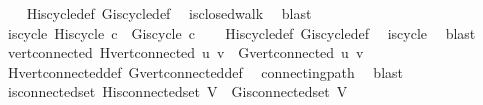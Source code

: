\begin{isabellebody}
%
\isadelimproof
\ \ %
\endisadelimproof
%
\isatagproof
{}\isamarkupfalse%
\ H{\isachardot}{\kern0pt}is{\isacharunderscore}{\kern0pt}cycle{\isacharunderscore}{\kern0pt}def\ G{\isachardot}{\kern0pt}is{\isacharunderscore}{\kern0pt}cycle{\isacharunderscore}{\kern0pt}def\ \isamarkupfalse%
\ is{\isacharunderscore}{\kern0pt}closed{\isacharunderscore}{\kern0pt}walk\ \isamarkupfalse%
\ blast%
\endisatagproof
{\isafoldproof}%
%
\isadelimproof
\isanewline
%
\endisadelimproof
\isanewline
{}\isamarkupfalse%
\ is{\isacharunderscore}{\kern0pt}cycle{}{\isacharcolon}{\kern0pt}\ {\isachardoublequoteopen}H{\isachardot}{\kern0pt}is{\isacharunderscore}{\kern0pt}cycle{}\ c\ {\isasymLongrightarrow}\ G{\isachardot}{\kern0pt}is{\isacharunderscore}{\kern0pt}cycle{}\ c{\isachardoublequoteclose}\isanewline
%
\isadelimproof
\ \ %
\endisadelimproof
%
\isatagproof
{}\isamarkupfalse%
\ H{\isachardot}{\kern0pt}is{\isacharunderscore}{\kern0pt}cycle{}{\isacharunderscore}{\kern0pt}def\ G{\isachardot}{\kern0pt}is{\isacharunderscore}{\kern0pt}cycle{}{\isacharunderscore}{\kern0pt}def\ \isamarkupfalse%
\ is{\isacharunderscore}{\kern0pt}cycle\ \isamarkupfalse%
\ blast%
\endisatagproof
{\isafoldproof}%
%
\isadelimproof
\isanewline
%
\endisadelimproof
\isanewline
{}\isamarkupfalse%
\ vert{\isacharunderscore}{\kern0pt}connected{\isacharcolon}{\kern0pt}\ {\isachardoublequoteopen}H{\isachardot}{\kern0pt}vert{\isacharunderscore}{\kern0pt}connected\ u\ v\ {\isasymLongrightarrow}\ G{\isachardot}{\kern0pt}vert{\isacharunderscore}{\kern0pt}connected\ u\ v{\isachardoublequoteclose}\isanewline
%
\isadelimproof
\ \ %
\endisadelimproof
%
\isatagproof
{}\isamarkupfalse%
\ H{\isachardot}{\kern0pt}vert{\isacharunderscore}{\kern0pt}connected{\isacharunderscore}{\kern0pt}def\ G{\isachardot}{\kern0pt}vert{\isacharunderscore}{\kern0pt}connected{\isacharunderscore}{\kern0pt}def\ \isamarkupfalse%
\ connecting{\isacharunderscore}{\kern0pt}path\ \isamarkupfalse%
\ blast%
\endisatagproof
{\isafoldproof}%
%
\isadelimproof
\isanewline
%
\endisadelimproof
\isanewline
{}\isamarkupfalse%
\ is{\isacharunderscore}{\kern0pt}connected{\isacharunderscore}{\kern0pt}set{\isacharcolon}{\kern0pt}\ {\isachardoublequoteopen}H{\isachardot}{\kern0pt}is{\isacharunderscore}{\kern0pt}connected{\isacharunderscore}{\kern0pt}set\ V{\isacharprime}{\kern0pt}\ {\isasymLongrightarrow}\ G{\isachardot}{\kern0pt}is{\isacharunderscore}{\kern0pt}connected{\isacharunderscore}{\kern0pt}set\ V{\isacharprime}{\kern0pt}{\isachardoublequoteclose}\isanewline

\end{isabellebody}
